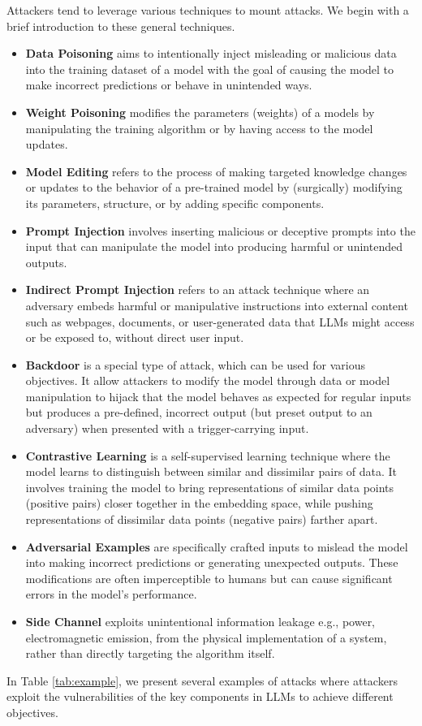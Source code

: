 Attackers tend to leverage various techniques to mount attacks. We begin with a brief introduction to these general techniques.
\begin{itemize}
    \item{\bf Data Poisoning} aims to intentionally inject misleading or malicious data into the training dataset of a model with the goal of causing the model to make incorrect predictions or behave in unintended ways. 

    \item{\bf Weight Poisoning} modifies the parameters (weights) of a models by manipulating the training algorithm or by having access to the model updates. 

    \item{\bf Model Editing} refers to the process of making targeted knowledge changes or updates to the behavior of a pre-trained model by (surgically) modifying its parameters, structure, or by adding specific components. 

    \item{\bf Prompt Injection} involves inserting malicious or deceptive prompts into the input that can manipulate the model into producing harmful or unintended outputs.

    \item{\bf Indirect Prompt Injection} refers to an attack technique where an adversary embeds harmful or manipulative instructions into external content such as webpages, documents, or user-generated data that LLMs might access or be exposed to, without direct user input. 

    \item{\bf Backdoor} is a special type of attack, which can be used for various objectives. It allow attackers to modify the model through data or model manipulation to hijack that the model behaves as expected for regular inputs but produces a pre-defined, incorrect output (but preset output to an adversary) when presented with a trigger-carrying input.

    \item{\bf Contrastive Learning} is a self-supervised learning technique where the model learns to distinguish between similar and dissimilar pairs of data. It involves training the model to bring representations of similar data points (positive pairs) closer together in the embedding space, while pushing representations of dissimilar data points (negative pairs) farther apart. 

    \item{\bf Adversarial Examples} are specifically crafted inputs to mislead the model into making incorrect predictions or generating unexpected outputs. These modifications are often imperceptible to humans but can cause significant errors in the model's performance.

    \item{\bf Side Channel} exploits unintentional information leakage e.g., power, electromagnetic emission, from the physical implementation of a system, rather than directly targeting the algorithm itself. 
\end{itemize}
In Table \ref{tab:example}, we present several examples of attacks where attackers exploit the vulnerabilities of the key components in LLMs to achieve different objectives.









